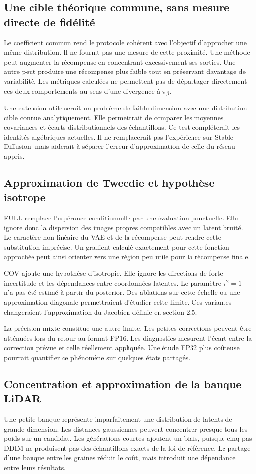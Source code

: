 \documentclass[11pt,a4paper]{article}
\begin{document}
\subsection{Une cible théorique commune, sans mesure directe de fidélité}
Le coefficient commun rend le protocole cohérent avec l'objectif d'approcher une même distribution. Il ne fournit pas une mesure de cette proximité. Une méthode peut augmenter la récompense en concentrant excessivement ses sorties. Une autre peut produire une récompense plus faible tout en préservant davantage de variabilité. Les métriques calculées ne permettent pas de départager directement ces deux comportements au sens d'une divergence à $\pi_\beta$.

Une extension utile serait un problème de faible dimension avec une distribution cible connue analytiquement. Elle permettrait de comparer les moyennes, covariances et écarts distributionnels des échantillons. Ce test compléterait les identités algébriques actuelles. Il ne remplacerait pas l'expérience sur Stable Diffusion, mais aiderait à séparer l'erreur d'approximation de celle du réseau appris.

\subsection{Approximation de Tweedie et hypothèse isotrope}
FULL remplace l'espérance conditionnelle par une évaluation ponctuelle. Elle ignore donc la dispersion des images propres compatibles avec un latent bruité. Le caractère non linéaire du VAE et de la récompense peut rendre cette substitution imprécise. Un gradient calculé exactement pour cette fonction approchée peut ainsi orienter vers une région peu utile pour la récompense finale.

COV ajoute une hypothèse d'isotropie. Elle ignore les directions de forte incertitude et les dépendances entre coordonnées latentes. Le paramètre $\tau^2=1$ n'a pas été estimé à partir du posterior. Des ablations sur cette échelle ou une approximation diagonale permettraient d'étudier cette limite. Ces variantes changeraient l'approximation du Jacobien définie en section 2.5.

La précision mixte constitue une autre limite. Les petites corrections peuvent être atténuées lors du retour au format FP16. Les diagnostics mesurent l'écart entre la correction prévue et celle réellement appliquée. Une étude FP32 plus coûteuse pourrait quantifier ce phénomène sur quelques états partagés.

\subsection{Concentration et approximation de la banque LiDAR}
Une petite banque représente imparfaitement une distribution de latents de grande dimension. Les distances gaussiennes peuvent concentrer presque tous les poids sur un candidat. Les générations courtes ajoutent un biais, puisque cinq pas DDIM ne produisent pas des échantillons exacts de la loi de référence. Le partage d'une banque entre les graines réduit le coût, mais introduit une dépendance entre leurs résultats.
\end{document}

